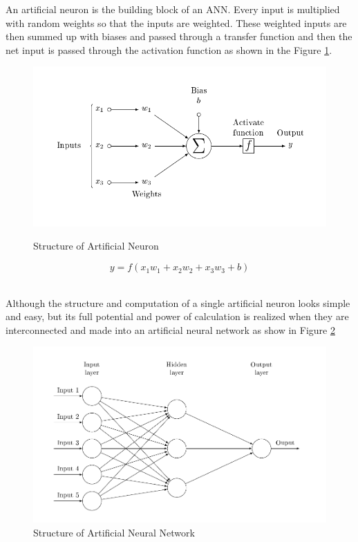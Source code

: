 \documentclass[12pt, a4paper]{report}
\begin{document}
An artificial neuron is the building block of an ANN. Every input is multiplied with random weights so that the inputs are weighted. These weighted inputs are then summed up with biases and passed through a transfer function and then the net input is passed through the activation function as shown in the Figure \ref{fig:AN}. \\ \par
\begin{figure}[h]
\centering	
\includegraphics[width=12cm]{ArtificialNeuronModel.png}\\
\caption{Structure of Artificial Neuron}
\label{fig:AN}
\end{figure} 	
\begin{equation}
y=f(x_{1}w_{1}+x_{2}w_{2}+x_{3}w_{3}+b)
\label{Artificial Neuron formula}
\end{equation}\\
\par
Although the structure and computation of a single artificial neuron looks simple and easy, but its full potential and power of calculation is realized when they are interconnected and made into an artificial neural network as show in Figure \ref{fig:NN}\\ \par
\begin{figure}[h]
\centering
\includegraphics[width=12cm]{neural_network.png}
\caption{Structure of Artificial Neural Network}
\label{fig:NN}
\end{figure}
\end{document}
